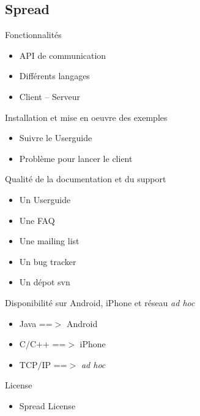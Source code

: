 \documentclass{beamer}
\begin{document}
\begin{frame}
  \tableofcontents[currentsection]
\end{frame}


\subsection{Spread}

\begin{frame}
  \begin{block}{Fonctionnalités}
    \begin{itemize}
      \item API de communication
      \item Différents langages
      \item Client -- Serveur
    \end{itemize}
  \end{block}
  \begin{block}{Installation et mise en oeuvre des exemples}
    \begin{itemize}
      \item Suivre le Userguide
      \item Problème pour lancer le client
    \end{itemize}
  \end{block}
\end{frame}
\begin{frame}
  \begin{block}{Qualité de la documentation et du support}
    \begin{itemize}
      \item Un Userguide
      \item Une FAQ
      \item Une mailing list
      \item Un bug tracker
      \item Un dépot svn
    \end{itemize}
  \end{block}
  \begin{block}{Disponibilité sur Android, iPhone et réseau \emph{ad hoc}}
    \begin{itemize}
      \item Java ==$>$ Android
      \item C$/$C$+$$+$ ==$>$ iPhone
      \item TCP$/$IP ==$>$ \emph{ad hoc}
    \end{itemize}
  \end{block}
  \begin{block}{License}
    \begin{itemize}
      \item Spread License
    \end{itemize}
  \end{block}
\end{frame}
\end{document}
